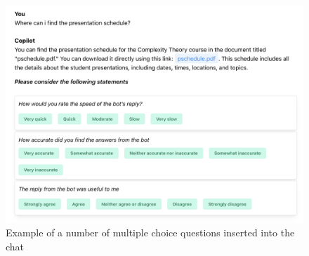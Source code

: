 \begin{figure}[H]
    \centering
    \includegraphics[width=\textwidth]{content/figures/assets/15-feedback-choices.png}
    \caption{Example of a number of multiple choice questions inserted into the chat}
    \label{fig:multiple_choice}
\end{figure}

